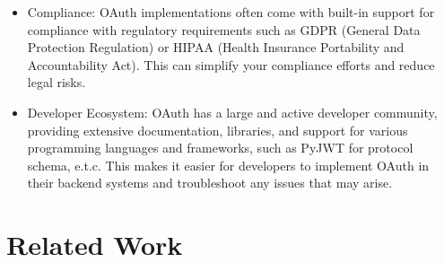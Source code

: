 \begin{itemize}
    \item {Compliance:} OAuth implementations often come with built-in support for compliance with regulatory requirements such as GDPR (General Data Protection Regulation) or HIPAA (Health Insurance Portability and Accountability Act). This can simplify your compliance efforts and reduce legal risks.
    \item {Developer Ecosystem:} OAuth has a large and active developer community, providing extensive documentation, libraries, and support for various 
    programming languages and frameworks, such as PyJWT for protocol schema, e.t.c. This makes it easier for developers to implement OAuth in their backend 
    systems and troubleshoot any issues that may arise.
\end{itemize}

\section{Related Work}


